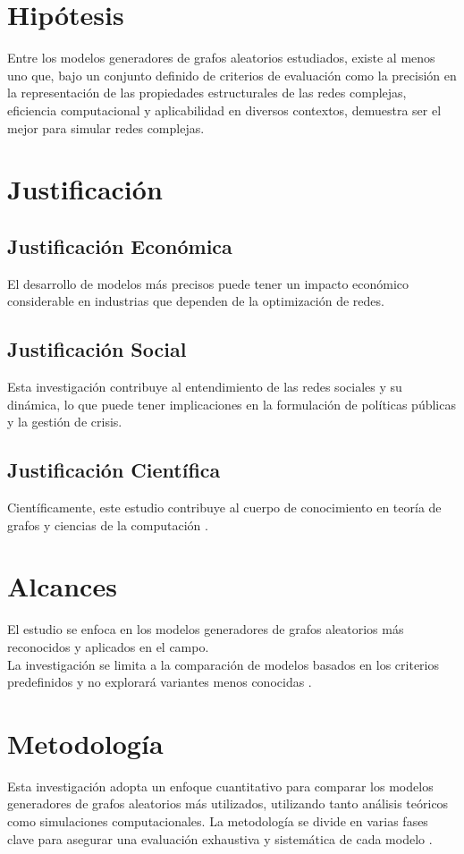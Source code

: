 \section{Hipótesis}
Entre los modelos generadores de grafos aleatorios estudiados, existe al menos uno que,
bajo un conjunto definido de criterios de evaluación como la precisión en la representación de las propiedades 
estructurales de las redes complejas, eficiencia computacional y aplicabilidad en diversos contextos, demuestra ser 
el mejor para simular redes complejas.

\section{Justificación}
\subsection{Justificación Económica}
El desarrollo de modelos más precisos puede tener un impacto económico considerable en industrias que dependen de la optimización de redes.
\subsection{Justificación Social}
Esta investigación contribuye al entendimiento de las redes sociales y su dinámica, lo que puede tener implicaciones en la formulación de políticas públicas y la gestión de crisis.
\subsection{Justificación Científica}
Científicamente, este estudio contribuye al cuerpo de conocimiento en teoría de grafos y ciencias de la computación .

\section{Alcances}
El estudio se enfoca en los modelos generadores de grafos aleatorios más reconocidos y aplicados en el campo.\\
La investigación se limita a la comparación de modelos basados en los criterios predefinidos y no explorará variantes menos conocidas .

\section{Metodología}

Esta investigación adopta un enfoque cuantitativo para comparar los modelos generadores de grafos aleatorios más utilizados, utilizando tanto análisis teóricos como simulaciones computacionales. La metodología se divide en varias fases clave para asegurar una evaluación exhaustiva y sistemática de cada modelo .

